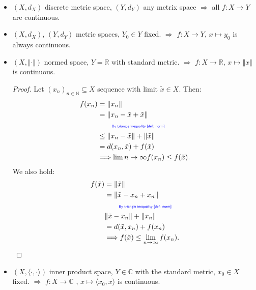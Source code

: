 \documentclass[../../note.tex]{subfiles}
\begin{document}
\begin{example}
    \begin{itemize}
        \item $(X,d_X)$ discrete metric space, $(Y, d_Y)$ any metrix space $\Longrightarrow$ all $f: X \rightarrow Y$ are continuous.
        \item $(X,d_X)$, $(Y, d_Y)$ metric spaces, $Y_0 \in Y$ fixed. $\Longrightarrow$ $f: X \rightarrow Y$, $x \mapsto y_0$ is always continuous.
        \item $(X, \Vert \cdot \Vert)$ normed space, $Y = \mathbb{R}$ with standard metric. $\Longrightarrow$ $f: X \rightarrow \mathbb{R}$, $x \mapsto \Vert x \Vert$ is continuous.
        \begin{proof}
            Let $(x_n)_{n \in \mathbb{N}} \subseteq X$ sequence with limit $\tilde{x} \in X$. Then:
            \begin{align}
                f(x_n) 
                &= \Vert x_n \Vert \\
                &= \Vert x_n -\tilde{x} + \tilde{x} \Vert \\
                &\qquad\text{\color{blue}{\tiny\sffamily By triangle inequality \ref{def: norm}}} \nonumber \\
                &\leq \Vert x_n -\tilde{x} \Vert + \Vert \tilde{x}\Vert \\
                &= d(x_n, \tilde{x}) + f(\tilde{x}) \\
                &\Longrightarrow \lim{n \rightarrow \infty} f(x_n) \leq f(\tilde{x}).
            \end{align}
            We also hold:
            \begin{align}
                f(\tilde{x})
                &= \Vert \tilde{x} \Vert \\
                &= \Vert \tilde{x}-x_n + x_n \Vert \\
                &\qquad\text{\color{blue}{\tiny\sffamily By triangle inequality \ref{def: norm}}} \nonumber \\
                &\Vert \tilde{x} - x_n \Vert + \Vert x_n \Vert \\
                &= d(\tilde{x},x_n) + f(x_n) \\
                &\Longrightarrow f(\tilde{x})\leq \lim_{n \rightarrow \infty} f(x_n).
            \end{align}
        \end{proof}
        \item $(X, \langle \cdot, \cdot \rangle)$ inner product space, $Y \in \mathbb{C}$ with the standard metric, $x_0 \in X$ fixed. $\Longrightarrow$ $f: X \rightarrow \mathbb{C}$ , $x \mapsto \langle x_0, x \rangle$ is continuous.

\end{itemize}
\end{example}
\end{document}

